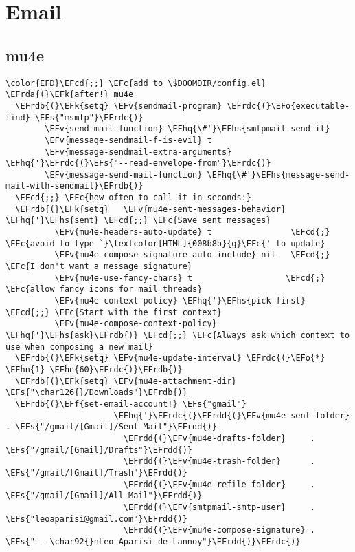 \documentclass[c]{article}
\theoremstyle{plain}%
\theoremstyle{definition}
\theoremstyle{remark}
\newcommand{\EFc}[1]{\textcolor{EFc}{#1}} %
\newcommand{\EFcd}[1]{\textcolor{EFcd}{#1}} %
\newcommand{\EFs}[1]{\textcolor{EFs}{#1}} %
\newcommand{\EFk}[1]{\textcolor{EFk}{#1}} %
\newcommand{\EFf}[1]{\textcolor{EFf}{#1}} %
\newcommand{\EFv}[1]{\textcolor{EFv}{#1}} %
\newcommand{\EFo}[1]{\textcolor{EFo}{#1}} %
\newcommand{\EFhn}[1]{\textcolor{EFhn}{\textbf{#1}}} %
\newcommand{\EFhq}[1]{\textcolor{EFhq}{#1}} %
\newcommand{\EFhs}[1]{\textcolor{EFhs}{#1}} %
\newcommand{\EFrda}[1]{\textcolor{EFrda}{#1}} %
\newcommand{\EFrdb}[1]{\textcolor{EFrdb}{#1}} %
\newcommand{\EFrdc}[1]{\textcolor{EFrdc}{#1}} %
\newcommand{\EFrdd}[1]{\textcolor{EFrdd}{#1}} %
\begin{document}
\section{Email}
\label{sec:orgd9707fc}
\subsection{mu4e}
\label{sec:orgdfeef23}
\begin{Code}
\begin{Verbatim}
\color{EFD}\EFcd{;;} \EFc{add to \$DOOMDIR/config.el}
\EFrda{(}\EFk{after!} mu4e
  \EFrdb{(}\EFk{setq} \EFv{sendmail-program} \EFrdc{(}\EFo{executable-find} \EFs{"msmtp"}\EFrdc{)}
        \EFv{send-mail-function} \EFhq{\#'}\EFhs{smtpmail-send-it}
        \EFv{message-sendmail-f-is-evil} t
        \EFv{message-sendmail-extra-arguments} \EFhq{'}\EFrdc{(}\EFs{"--read-envelope-from"}\EFrdc{)}
        \EFv{message-send-mail-function} \EFhq{\#'}\EFhs{message-send-mail-with-sendmail}\EFrdb{)}
  \EFcd{;;} \EFc{how often to call it in seconds:}
  \EFrdb{(}\EFk{setq}   \EFv{mu4e-sent-messages-behavior} \EFhq{'}\EFhs{sent} \EFcd{;;} \EFc{Save sent messages}
          \EFv{mu4e-headers-auto-update} t                \EFcd{;} \EFc{avoid to type `}\textcolor[HTML]{008b8b}{g}\EFc{' to update}
          \EFv{mu4e-compose-signature-auto-include} nil   \EFcd{;} \EFc{I don't want a message signature}
          \EFv{mu4e-use-fancy-chars} t                   \EFcd{;} \EFc{allow fancy icons for mail threads}
          \EFv{mu4e-context-policy} \EFhq{'}\EFhs{pick-first}   \EFcd{;;} \EFc{Start with the first context}
          \EFv{mu4e-compose-context-policy} \EFhq{'}\EFhs{ask}\EFrdb{)} \EFcd{;;} \EFc{Always ask which context to use when composing a new mail}
  \EFrdb{(}\EFk{setq} \EFv{mu4e-update-interval} \EFrdc{(}\EFo{*} \EFhn{1} \EFhn{60}\EFrdc{)}\EFrdb{)}
  \EFrdb{(}\EFk{setq} \EFv{mu4e-attachment-dir} \EFs{"\char126{}/Downloads"}\EFrdb{)}
  \EFrdb{(}\EFf{set-email-account!} \EFs{"gmail"}
                      \EFhq{'}\EFrdc{(}\EFrdd{(}\EFv{mu4e-sent-folder}       . \EFs{"/gmail/[Gmail]/Sent Mail"}\EFrdd{)}
                        \EFrdd{(}\EFv{mu4e-drafts-folder}     . \EFs{"/gmail/[Gmail]/Drafts"}\EFrdd{)}
                        \EFrdd{(}\EFv{mu4e-trash-folder}      . \EFs{"/gmail/[Gmail]/Trash"}\EFrdd{)}
                        \EFrdd{(}\EFv{mu4e-refile-folder}     . \EFs{"/gmail/[Gmail]/All Mail"}\EFrdd{)}
                        \EFrdd{(}\EFv{smtpmail-smtp-user}     . \EFs{"leoaparisi@gmail.com"}\EFrdd{)}
                        \EFrdd{(}\EFv{mu4e-compose-signature} . \EFs{"---\char92{}nLeo Aparisi de Lannoy"}\EFrdd{)}\EFrdc{)}

\end{Verbatim}
\end{Code}
\end{document}
